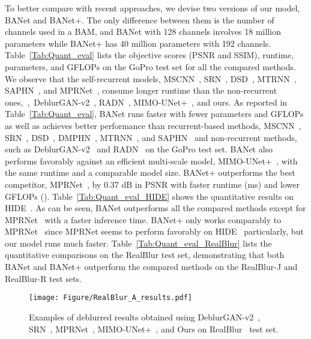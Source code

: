To better compare with recent approaches, we devise two versions of our model, BANet and BANet+. The only difference between them is the number of channels used in a BAM, and BANet with 128 channels involves 18 million parameters while BANet+ has 40 million parameters with 192 channels.
Table~\ref{Tab:Quant_eval} lists the objective scores (PSNR and SSIM), runtime, parameters, and GFLOPs on the GoPro test set for all the compared methods.
We observe that the self-recurrent models, MSCNN~\cite{Nah_2017_CVPR}, SRN~\cite{tao2018srndeblur}, DSD~\cite{gao2019dynamic}, MTRNN~\cite{MT_2020_ECCV}, SAPHN~\cite{SAPN2020}, and MPRNet~\cite{Zamir_2021_CVPR}, consume longer runtime than the non-recurrent ones,~\ie,~DeblurGAN-v2~\cite{Kupyn_2019_ICCV}, RADN~\cite{RADN_2020_ECCV}, MIMO-UNet+~\cite{MIMO}, and ours.
As reported in Table~\ref{Tab:Quant_eval}, BANet runs faster with fewer parameters and GFLOPs as well as achieves better performance than recurrent-based methods, MSCNN~\cite{Nah_2017_CVPR}, SRN~\cite{tao2018srndeblur}, DSD~\cite{gao2019dynamic}, DMPHN~\cite{Zhang_2019_CVPR}, MTRNN~\cite{MT_2020_ECCV}, and SAPHN~\cite{SAPN2020} and non-recurrent methods, such as DeblurGAN-v2~\cite{Kupyn_2019_ICCV} and RADN~\cite{RADN_2020_ECCV} on the GoPro test set. BANet also performs favorably against an efficient multi-scale model, MIMO-UNet+~\cite{MIMO}, with the same runtime and a comparable model size. 
BANet+ outperforms the best competitor, MPRNet~\cite{Zamir_2021_CVPR}, by 0.37 dB in PSNR with faster runtime (ms) and lower GFLOPs ().
Table~\ref{Tab:Quant_eval_HIDE} shows the quantitative results on HIDE~\cite{HAdeblur}. As can be seen, BANet outperforms all the compared methods except for MPRNet~\cite{Zamir_2021_CVPR} with a faster inference time. BANet+ only works comparably to MPRNet~\cite{Zamir_2021_CVPR} since MPRNet seems to perform favorably on HIDE~\cite{HAdeblur} particularly, but our model runs much faster.
Table~\ref{Tab:Quant_eval_RealBlur} lists the quantitative comparisons on the RealBlur test set, demonstrating that both BANet and BANet+ outperform the compared methods on the RealBlur-J and RealBlur-R test sets.

\begin{figure*}[t!]
\centering
\texttt{[image: Figure/RealBlur\_A\_results.pdf]}
\vspace{-0.1in}
\caption{Examples of deblurred results obtained using DeblurGAN-v2~\cite{Kupyn_2019_ICCV}, SRN~\cite{tao2018srndeblur},  MPRNet~\cite{Zamir_2021_CVPR}, MIMO-UNet+~\cite{MIMO}, and Ours on RealBlur~\cite{rim_2020_ECCV} test set.}
\label{fig:RealBlur_A}
\vspace{-0.2in}
\end{figure*}

